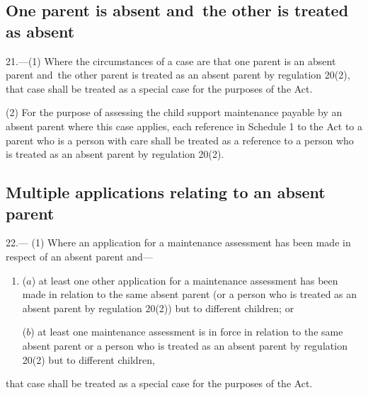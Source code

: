 \documentclass[12pt,a4paper]{article}
\begin{document}

\subsection[21. One parent is absent and~the other is treated as absent]{One parent is absent and~the other is treated as absent}

21.—(1) Where the circumstances of a case are that one parent is an absent parent and~the other parent is treated as an absent parent by regulation 20(2), that case shall be treated as a special case for the purposes of the Act.

(2) For the purpose of assessing the child support maintenance payable by an absent parent where this case applies, each reference in Schedule 1 to the Act to a parent who is a person with care shall be treated as a reference to a person who is treated as an absent parent by regulation 20(2).

\subsection[22. Multiple applications relating to an absent parent]{Multiple applications relating to an absent parent}

22.—%
%
%
(1) Where an application for a maintenance assessment has been made in respect of an absent parent and—
\begin{enumerate}\item[]
($a$) at least one other application for a maintenance assessment has been made in relation to the same absent parent (or a person who is treated as an absent parent by regulation 20(2)) but to different children; or

($b$) at least one maintenance assessment is in force in relation to the same absent parent or a person who is treated as an absent parent by regulation 20(2) but to different children,
\end{enumerate}
that case shall be treated as a special case for the purposes of the Act.
\end{document}
